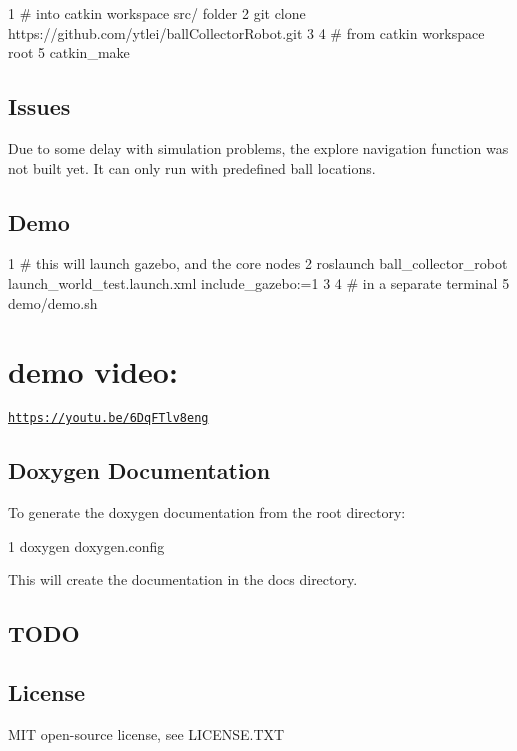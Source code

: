 \begin{DoxyCode}
1 # into catkin workspace src/ folder
2 git clone https://github.com/ytlei/ballCollectorRobot.git
3 
4 # from catkin workspace root
5 catkin\_make 
\end{DoxyCode}


\subsection*{Issues}

Due to some delay with simulation problems, the explore navigation function was not built yet. It can only run with predefined ball locations.

\subsection*{Demo}


\begin{DoxyCode}
1 # this will launch gazebo, and the core nodes
2 roslaunch ball\_collector\_robot launch\_world\_test.launch.xml include\_gazebo:=1
3 
4 # in a separate terminal
5 demo/demo.sh 
\end{DoxyCode}


\section*{demo video\+:}

\href{https://youtu.be/6DqFTlv8eng}{\tt https\+://youtu.\+be/6\+Dq\+F\+Tlv8eng}

\subsection*{Doxygen Documentation}

To generate the doxygen documentation from the root directory\+:


\begin{DoxyCode}
1 doxygen doxygen.config
\end{DoxyCode}


This will create the documentation in the docs directory.

\subsection*{T\+O\+DO}

\subsection*{License}

M\+IT open-\/source license, see L\+I\+C\+E\+N\+S\+E.\+T\+XT 
